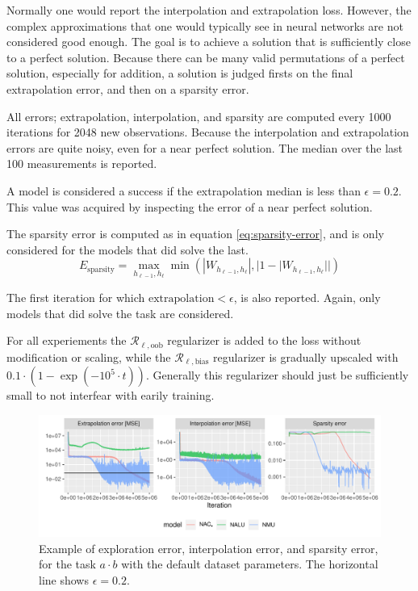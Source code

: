 Normally one would report the interpolation and extrapolation loss. However, the complex approximations that one would typically see in neural networks are not considered good enough. The goal is to achieve a solution that is sufficiently close to a perfect solution. Because there can be many valid permutations of a perfect solution, especially for addition, a solution is judged firsts on the final extrapolation error, and then on a sparsity error.

All errors; extrapolation, interpolation, and sparsity are computed every 1000 iterations for 2048 new observations. Because the interpolation and extrapolation errors are quite noisy, even for a near perfect solution. The median over the last 100 measurements is reported.

A model is considered a success if the extrapolation median is less than $\epsilon = 0.2$. This value was acquired by inspecting the error of a near perfect solution. 

The sparsity error is computed as in equation \ref{eq:sparsity-error}, and is only considered for the models that did solve the last.
\begin{equation}
E_\mathrm{sparsity} = \max_{h_{\ell-1}, h_{\ell}} \min(|W_{h_{\ell-1},h_\ell}|, |1 - |W_{h_{\ell-1},h_\ell}||)
\label{eq:sparsity-error}
\end{equation}

The first iteration for which $\mathrm{extrapolation} < \epsilon$, is also reported. Again, only models that did solve the task are considered.

For all experiements the $\mathcal{R}_{\ell,\mathrm{oob}}$ regularizer is added to the loss without modification or scaling, while the $\mathcal{R}_{\ell,\mathrm{bias}}$ regularizer is gradually upscaled with $0.1 \cdot (1 - \exp(-10^5 \cdot t))$. Generally this regularizer should just be sufficiently small to not interfear with earily training.

\begin{figure}[ht]
\centering
\includegraphics[width=\linewidth]{results/function-task-static-example.pdf}
\caption{Example of exploration error, interpolation error, and sparsity error, for the task $a \cdot b$ with the default dataset parameters. The horizontal line shows $\epsilon = 0.2$.}
\end{figure}

